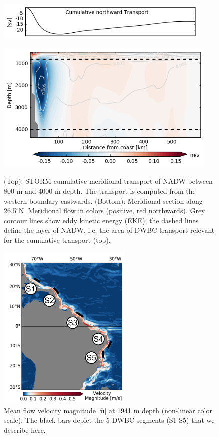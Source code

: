 \documentclass{ametsoc}
\begin{document}
\begin{figure}[t]\noindent
			\hspace{2.5mm}\includegraphics[width=24.4pc,angle=0]{figs/intro_DWBC_transport.png}\\
		
		\vspace*{-6mm}
	
		\includegraphics[width=25pc,angle=0]{figs/intro_DWBC_structure.png}\\
  \caption{(Top): STORM cumulative meridional transport of NADW between 800 m and 4000 m depth. The transport is computed from the western boundary eastwards. (Bottom): Meridional section along 26.5$^\circ$N. Meridional flow in colors (positive, red northwards).  Grey contour lines show eddy kinetic energy (EKE), the dashed lines define the layer of NADW, i.e. the area of DWBC transport relevant for the cumulative transport (top). }
\label{fig:intro_dwbc_structure}
\end{figure}


\begin{figure}
\label{fig:sketch_dwbc_north}
\includegraphics[height=8cm]{figs/blank_map_.pdf}
\caption{Mean flow velocity magnitude $|\mathbf{\overline u}|$ at 1941 m depth (non-linear color scale). The black bars depict the 5 DWBC segments (S1-S5) that we describe here.} 
\label{fig:segments}
\end{figure}
\end{document}
